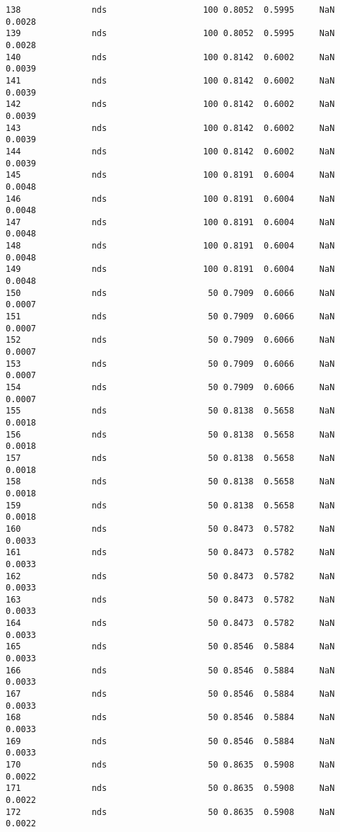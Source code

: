 \documentclass[11pt]{article}
\begin{document}
\begin{Verbatim}[commandchars=\\\{\}]
138              nds                   100 0.8052  0.5995     NaN 0.0028   
139              nds                   100 0.8052  0.5995     NaN 0.0028   
140              nds                   100 0.8142  0.6002     NaN 0.0039   
141              nds                   100 0.8142  0.6002     NaN 0.0039   
142              nds                   100 0.8142  0.6002     NaN 0.0039   
143              nds                   100 0.8142  0.6002     NaN 0.0039   
144              nds                   100 0.8142  0.6002     NaN 0.0039   
145              nds                   100 0.8191  0.6004     NaN 0.0048   
146              nds                   100 0.8191  0.6004     NaN 0.0048   
147              nds                   100 0.8191  0.6004     NaN 0.0048   
148              nds                   100 0.8191  0.6004     NaN 0.0048   
149              nds                   100 0.8191  0.6004     NaN 0.0048   
150              nds                    50 0.7909  0.6066     NaN 0.0007   
151              nds                    50 0.7909  0.6066     NaN 0.0007   
152              nds                    50 0.7909  0.6066     NaN 0.0007   
153              nds                    50 0.7909  0.6066     NaN 0.0007   
154              nds                    50 0.7909  0.6066     NaN 0.0007   
155              nds                    50 0.8138  0.5658     NaN 0.0018   
156              nds                    50 0.8138  0.5658     NaN 0.0018   
157              nds                    50 0.8138  0.5658     NaN 0.0018   
158              nds                    50 0.8138  0.5658     NaN 0.0018   
159              nds                    50 0.8138  0.5658     NaN 0.0018   
160              nds                    50 0.8473  0.5782     NaN 0.0033   
161              nds                    50 0.8473  0.5782     NaN 0.0033   
162              nds                    50 0.8473  0.5782     NaN 0.0033   
163              nds                    50 0.8473  0.5782     NaN 0.0033   
164              nds                    50 0.8473  0.5782     NaN 0.0033   
165              nds                    50 0.8546  0.5884     NaN 0.0033   
166              nds                    50 0.8546  0.5884     NaN 0.0033   
167              nds                    50 0.8546  0.5884     NaN 0.0033   
168              nds                    50 0.8546  0.5884     NaN 0.0033   
169              nds                    50 0.8546  0.5884     NaN 0.0033   
170              nds                    50 0.8635  0.5908     NaN 0.0022   
171              nds                    50 0.8635  0.5908     NaN 0.0022   
172              nds                    50 0.8635  0.5908     NaN 0.0022   

\end{Verbatim}
\end{document}
